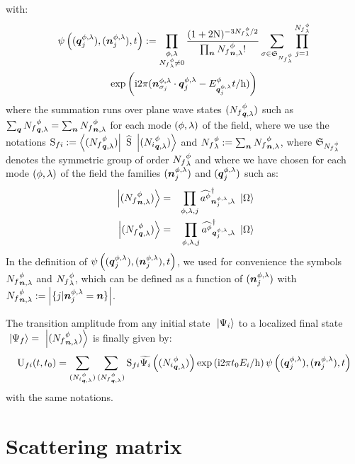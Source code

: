 \documentclass[10pt,a4paper,twoside,openany]{book}
\begin{document}
with:
\begin{multline*}
\psi \left( ( \q^{\pt, \sp}_j ), ( \n^{\pt, \sp}_j ), t \right) \eqdef \prod_{\substack{\pt, \sp \\ {N_f}^\pt_\sp \neq 0}} \frac{(1+2 \N)^{-3 {N_f}^\pt_\sp / 2} }{\prod_{\n} \bX {N_f} \pt \n \sp !} \sum_{\sigma \in \mathfrak{S}_{{N_f}^\pt_\sp}} \prod_{j = 1}^{{N_f}^\pt_\sp} \\
\exp{\i 2 \pi ( \n^{\pt, \sp}_{\sigma_j} \ssp \q^{\pt, \sp}_j - \Ek \pt {\q^{\pt, \sp}_j} t / \h )}
\end{multline*}
where the summation runs over plane wave states $\bFQ {N_f} \pt \q \sp$ such as $\sum_{\q} \bQ {N_f} \pt \q \sp = \sum_{\n} \bX {N_f} \pt \n \sp$ for each mode $( \pt, \sp )$ of the field, where we use the notations $\Sm f i \eqdef \bra{\bFQ {N_f} \pt \q \sp} \Sop \ket{\bFQ {N_i} \pt \q \sp}$ and ${N_f}^\pt_\sp \eqdef \sum_{\n} \bX {N_f} \pt \n \sp$, where $\mathfrak{S}_{{N_f}^\pt_\sp}$ denotes the symmetric group of order ${N_f}^\pt_\sp$ and where we have chosen for each mode $( \pt, \sp )$ of the field the families $( \n^{\pt, \sp}_j )$ and $( \q^{\pt, \sp}_j )$ such as:
\begin{eqnarray*}
\ket{\bFX {N_f} \pt \n \sp} & = & \prod_{\pt, \sp, j} \cop \pt {\n^{\pt, \sp}_j} \sp \ket{\vac} \\
\ket{\bFQ {N_f} \pt \q \sp} & = & \prod_{\pt, \sp, j} \cop \pt {\q^{\pt, \sp}_j} \sp \ket{\vac}
\end{eqnarray*}
In the definition of $\psi \left( ( \q^{\pt, \sp}_j ), ( \n^{\pt, \sp}_j ), t \right)$, we used for convenience the symbols $\bX {N_f} \pt \n \sp$ and ${N_f}^\pt_\sp$, which can be defined as a function of $( \n^{\pt, \sp}_j )$ with $\bX {N_f} \pt \n \sp \eqdef \left|  \{ j | \n^{\pt, \sp}_j = \n \} \right|$.

The transition amplitude from any initial state $\ket{\Psi_i}$ to a localized final state $\ket{\Psi_f} = \ket{\bFX {N_f} \pt \n \sp}$ is finally given by:
\begin{equation*}
\Um f i t {t_0} = \sum_{\bFQ {N_i} \pt \q \sp} \sum_{\bFQ {N_f} \pt \q \sp} \Sm f i \FT{\Psi_i} \left( \bFQ {N_i} \pt \q \sp \right) \exp{\i 2 \pi t_0 E_i / \h} \psi \left( ( \q^{\pt, \sp}_j ), ( \n^{\pt, \sp}_j ), t \right)
\end{equation*}
with the same notations.

\section{Scattering matrix}
\label{Scattering matrix}
\end{document}

